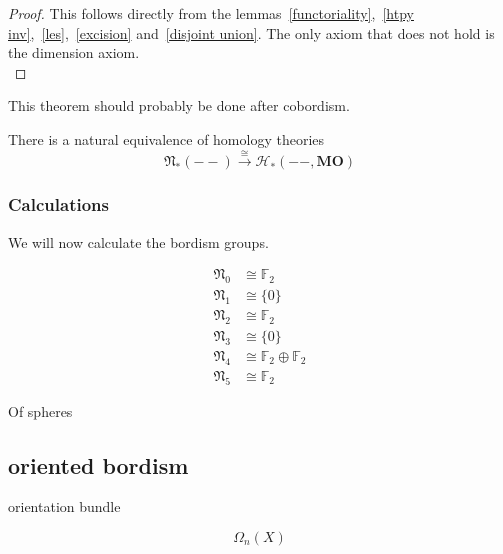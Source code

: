 \documentclass[a4paper,11pt]{article}
\begin{document}
\begin{proof}
    This follows directly from the lemmas\ \ref{functoriality},\ \ref{htpy inv},\ \ref{les},\ \ref{excision} and\ \ref{disjoint union}.
    The only axiom that does not hold is the dimension axiom.\\
\end{proof}


This theorem should probably be done after cobordism.
\begin{theorem}
    There is a natural equivalence of homology theories
    \[\mathfrak{N}_\ast(--)\xrightarrow{\cong}\mathcal{H}_\ast(--,\mathbf{MO})\]
\end{theorem}

\subsubsection{Calculations}

We will now calculate the bordism groups.

\begin{align*}
    \mathfrak N_0 &\cong \mathbb F_2\\
    \mathfrak N_1 &\cong \{0\}\\
    \mathfrak N_2 &\cong \mathbb F_2\\
    \mathfrak N_3 &\cong \{0\}\\
    \mathfrak N_4 &\cong \mathbb F_2\oplus\mathbb F_2\\
    \mathfrak N_5 &\cong \mathbb F_2
\end{align*}

Of spheres


\subsection{oriented bordism}

\begin{definition}
\end{definition}

\begin{definition}[orientation]
\end{definition}

orientation bundle

\begin{definition}[bordant]
\end{definition}

\begin{definition}
    \[\Omega_n(X)\]
\end{definition}
\end{document}
